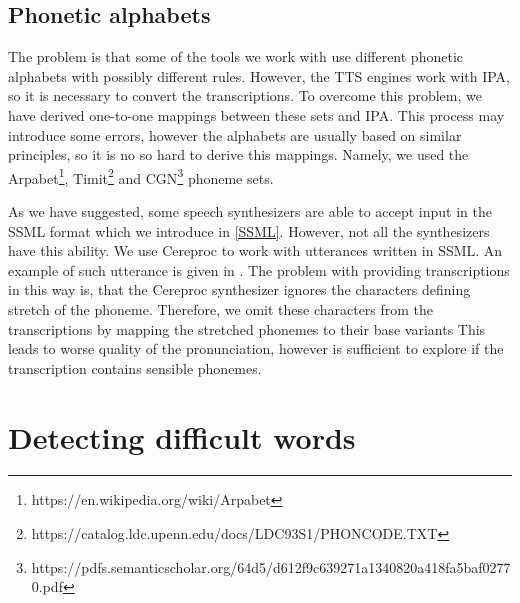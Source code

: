 \subsection{Phonetic alphabets}
\par
The problem is that some of the tools we work with use different phonetic alphabets with possibly different rules.
However, the TTS engines work with IPA, so it is necessary to convert the transcriptions.
To overcome this problem, we have derived one-to-one mappings between these sets and IPA.
This process may introduce some errors, however the alphabets are usually based on similar principles, so it is no so hard to derive this mappings.
Namely, we used the Arpabet\footnote{https://en.wikipedia.org/wiki/Arpabet}, Timit\footnote{https://catalog.ldc.upenn.edu/docs/LDC93S1/PHONCODE.TXT} and CGN\footnote{https://pdfs.semanticscholar.org/64d5/d612f9c639271a1340820a418fa5baf02770.pdf} phoneme sets.
\par
As we have suggested, some speech synthesizers are able to accept input in the SSML format which we introduce in \ref{SSML}.
However, not all the synthesizers have this ability.
We use Cereproc to work with utterances written in SSML.
An example of such utterance is given in .
The problem with providing transcriptions in this way is, that the Cereproc synthesizer ignores the characters defining stretch of the phoneme.
Therefore, we omit these characters from the transcriptions by mapping the stretched phonemes to their base variants
This leads to worse quality of the pronunciation, however is sufficient to explore if the transcription contains sensible phonemes.
\section{Detecting difficult words}
